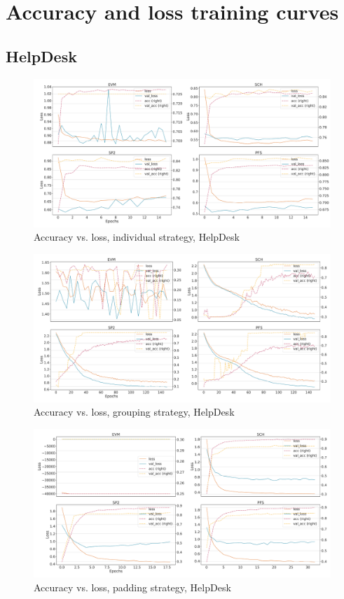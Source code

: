 \chapter{Accuracy and loss training curves}
\label{appendix:loss-curves}

\section*{HelpDesk}
\begin{figure}[!htb]
    \centering
    \includegraphics[width=\textwidth]{gfx/helpdesk/individual_loss_acc_curve.pdf}
    \caption{Accuracy vs. loss, individual strategy, HelpDesk}
\end{figure}
\begin{figure}[!htb]
    \centering
    \includegraphics[width=\textwidth]{gfx/helpdesk/grouped_loss_acc_curve.pdf}
    \caption{Accuracy vs. loss, grouping strategy, HelpDesk}
\end{figure}
\begin{figure}[!htb]
    \centering
    \includegraphics[width=\textwidth]{gfx/helpdesk/padded_loss_acc_curve.pdf}
    \caption{Accuracy vs. loss, padding strategy, HelpDesk}
\end{figure}
